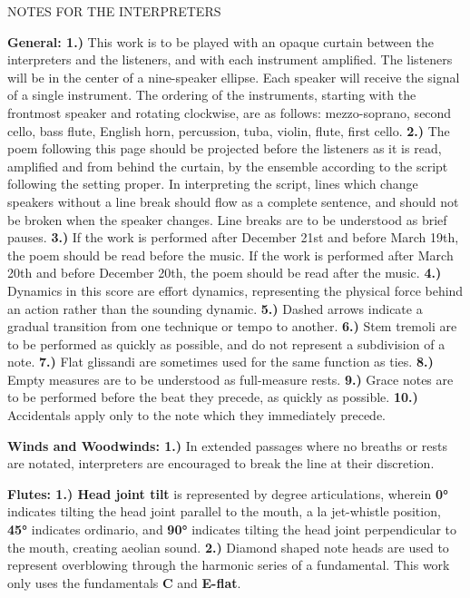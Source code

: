 \documentclass[11pt]{article}
\begin{document}
\vspace*{4\baselineskip}

\begingroup
\begin{center}
\huge NOTES FOR THE INTERPRETERS
\end{center}
\endgroup

\begingroup
\textbf{General: 1.)} This work is to be played with an opaque curtain between the interpreters and the listeners, and with each instrument amplified. The listeners will be in the center of a nine-speaker ellipse. Each speaker will receive the signal of a single instrument. The ordering of the instruments, starting with the frontmost speaker and rotating clockwise, are as follows: mezzo-soprano, second cello, bass flute, English horn, percussion, tuba, violin, flute, first cello. \textbf{2.)} The poem following this page should be projected before the listeners as it is read, amplified and from behind the curtain, by the ensemble according to the script following the setting proper. In interpreting the script, lines which change speakers without a line break should flow as a complete sentence, and should not be broken when the speaker changes. Line breaks are to be understood as brief pauses. \textbf{3.)} If the work is performed after December 21st and before March 19th, the poem should be read before the music. If the work is performed after March 20th and before December 20th, the poem should be read after the music. \textbf{4.)}  Dynamics in this score are effort dynamics, representing the physical force behind an action rather than the sounding dynamic. \textbf{5.)} Dashed arrows indicate a gradual transition from one technique or tempo to another. \textbf{6.)}  Stem tremoli are to be performed as quickly as possible, and do not represent a subdivision of a note. \textbf{7.)} Flat glissandi are sometimes used for the same function as ties. \textbf{8.)} Empty measures are to be understood as full-measure rests. \textbf{9.)} Grace notes are to be performed before the beat they precede, as quickly as possible. \textbf{10.)} Accidentals apply only to the note which they immediately precede.
\endgroup

\begingroup
\textbf{Winds and Woodwinds: 1.)} In extended passages where no breaths or rests are notated, interpreters are encouraged to break the line at their discretion.
\endgroup

\begingroup
\textbf{Flutes: 1.) Head joint tilt} is represented by degree articulations, wherein \textbf{0°} indicates tilting the head joint parallel to the mouth, a la jet-whistle position, \textbf{45°} indicates ordinario, and \textbf{90°} indicates tilting the head joint perpendicular to the mouth, creating aeolian sound. \textbf{2.)} Diamond shaped note heads are used to represent overblowing through the harmonic series of a fundamental. This work only uses the fundamentals \textbf{C} and \textbf{E-flat}.
\endgroup
\end{document}
